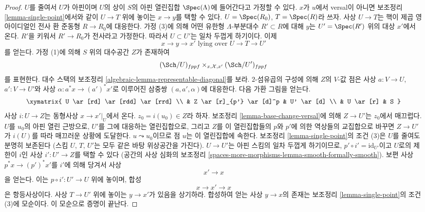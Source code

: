 \begin{proof}
$U$를 줄여서 $U$가 아핀이며 $U$의 상이 $S$의 아핀 열린집합
$\Spec(\Lambda)$에 들어간다고 가정할 수 있다.
$x$가 $u$에서 versal이 아니면 보조정리 \ref{lemma-single-point}에서와 같이
$U \to T$ 위에 놓이는 $x \to y$를 택할 수 있다.
$U = \Spec(R_0)$, $T = \Spec(R)$라 쓰자. 사상 $U \to T$는 핵이 제곱
영 아이디얼인 전사 환 준동형 $R \to R_0$에 대응한다.
가정 (3)에 의해 어떤 유한형 $\Lambda$-부분대수 $R' \subset R$에 대해
$y$는 $U' = \Spec(R')$ 위의 대상 $x'$에서 온다.
$R'$을 키워서 $R' \to R_0$가 전사라고 가정한다.
따라서 $U \subset U'$는 일차 두껍게 하기이다. 이제
$$
x \to y \to x'
\text{ lying over }
U \to T \to U'
$$
를 얻는다. 가정 (1)에 의해 $S$ 위의 대수공간 $Z$가 존재하여
$$
(\Sch/U)_{fppf} \times_{x, \mathcal{X}, x'} (\Sch/U')_{fppf}
$$
를 표현한다. 대수 스택의 보조정리
\ref{algebraic-lemma-representable-diagonal}를 보라.
$2$-섬유곱의 구성에 의해 $Z$의 $V$-값 점은 사상 $a : V \to U$,
$a' : V \to U'$와 사상 $\alpha : a^*x \to (a')^*x'$로 이루어진
삼중쌍 $(a, a', \alpha)$에 대응한다. 다음 가환 그림을 얻는다.
$$
\xymatrix{
U \ar[rd] \ar[rdd] \ar[rrd] \\
& Z \ar[r]_{p'} \ar[d]^p & U' \ar[d] \\
& U \ar[r] & S
}
$$
사상 $i : U \to Z$는 동형사상 $x \to x'|_U$에서 온다.
$z_0 = i(u_0) \in Z$라 하자. 보조정리 \ref{lemma-base-change-versal}에
의해 $Z \to U'$는 $z_0$에서 매끄럽다.
$U$를 $u_0$의 아핀 열린 근방으로, $U'$를 그에 대응하는 열린집합으로,
그리고 $Z$를 이 열린집합들의 $p$와 $p'$에 의한 역상들의 교집합으로
바꾸면 $Z \to U'$가 $i(U)$를 따라 매끄러운 상황에 도달한다.
$u \leadsto u_0$이므로 점 $u$는 이 열린집합에 속한다.
보조정리 \ref{lemma-single-point}의 조건 (3)은 $U$를 줄여도 분명히
보존된다 (스킴 $U$, $T$, $U'$는 모두 같은 바탕 위상공간을 가진다).
$U \to U'$는 아핀 스킴의 일차 두껍게 하기이므로,
$p' \circ i' = \text{id}_{U'}$이고 $U$로의 제한이 $i$인 사상
$i' : U' \to Z$를 택할 수 있다
(공간의 사상 심화의 보조정리
\ref{spaces-more-morphisms-lemma-smooth-formally-smooth}).
보편 사상 $p^*x \to (p')^*x'$를 $i'$에 의해 당겨서 사상
$$
x' \to x
$$
을 얻는다. 이는 $p \circ i' : U' \to U$ 위에 놓이며, 합성
$$
x \to x' \to x
$$
은 항등사상이다. 사상 $T \to U'$ 위에 놓이는 $y \to x'$가 있음을
상기하라. 합성하여 얻는 사상 $y \to x$의 존재는
보조정리 \ref{lemma-single-point}의 조건 (3)에 모순이다.
이 모순으로 증명이 끝난다.
\end{proof}






